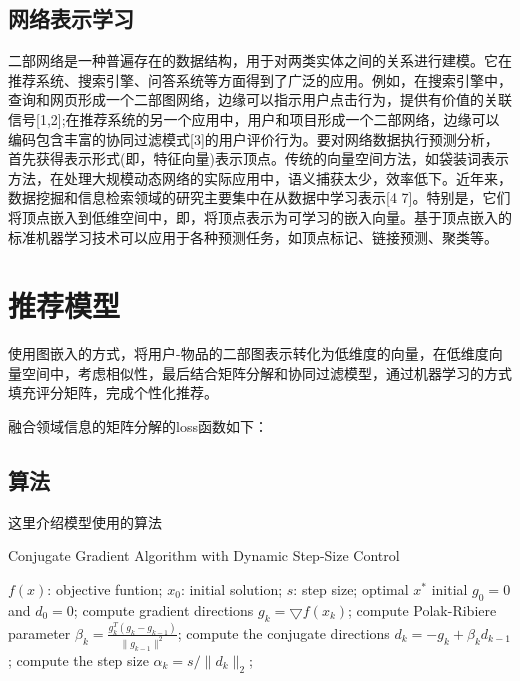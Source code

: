 \documentclass[lang=cn,11pt]{elegantpaper}
\begin{document}
\subsection{网络表示学习}

二部网络是一种普遍存在的数据结构，用于对两类实体之间的关系进行建模。它在推荐系统、搜索引擎、问答系统等方面得到了广泛的应用。例如，在搜索引擎中，查询和网页形成一个二部图网络，边缘可以指示用户点击行为，提供有价值的关联信号[1,2];在推荐系统的另一个应用中，用户和项目形成一个二部网络，边缘可以编码包含丰富的协同过滤模式[3]的用户评价行为。要对网络数据执行预测分析，首先获得表示形式(即，特征向量)表示顶点。传统的向量空间方法，如袋装词表示方法，在处理大规模动态网络的实际应用中，语义捕获太少，效率低下。近年来，数据挖掘和信息检索领域的研究主要集中在从数据中学习表示[4 7]。特别是，它们将顶点嵌入到低维空间中，即，将顶点表示为可学习的嵌入向量。基于顶点嵌入的标准机器学习技术可以应用于各种预测任务，如顶点标记、链接预测、聚类等。




\section{推荐模型}

使用图嵌入的方式，将用户-物品的二部图表示转化为低维度的向量，在低维度向量空间中，考虑相似性，最后结合矩阵分解和协同过滤模型，通过机器学习的方式填充评分矩阵，完成个性化推荐。

融合领域信息的矩阵分解的loss函数如下：


\subsection{算法}

这里介绍模型使用的算法

\begin{algorithm}[h]  
	\caption{Conjugate Gradient Algorithm with Dynamic Step-Size Control}  
	\label{alg::conjugateGradient}  
	\begin{algorithmic}[1]  
		\Require  
		$f(x)$: objective funtion;  
		$x_0$: initial solution;  
		$s$: step size;  
		\Ensure  
		optimal $x^{*}$  
		\State initial $g_0=0$ and $d_0=0$;  
		\Repeat  
		\State compute gradient directions $g_k=\bigtriangledown f(x_k)$;  
		\State compute Polak-Ribiere parameter $\beta_k=\frac{g_k^{T}(g_k-g_{k-1})}{\parallel g_{k-1} \parallel^{2}}$;  
		\State compute the conjugate directions $d_k=-g_k+\beta_k d_{k-1}$;  
		\State compute the step size $\alpha_k=s/\parallel d_k \parallel_{2}$;  
	\end{algorithmic}  
\end{algorithm}  
\end{document}
